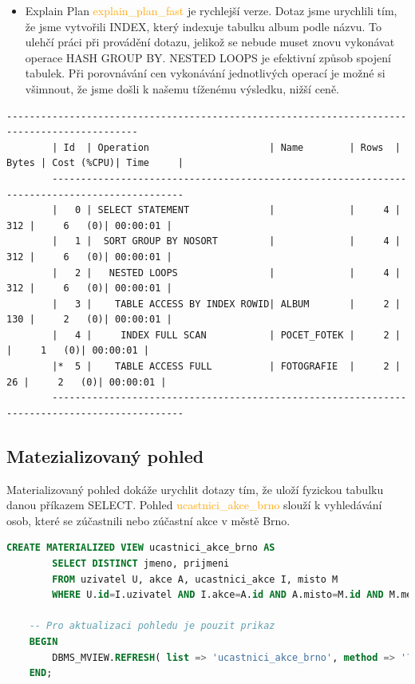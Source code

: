 \documentclass[11pt,a4paper]{article}
\begin{document}
        
        \begin{itemize}
            \item Explain Plan \textcolor{orange}{explain\_plan\_fast} je rychlejší verze. Dotaz jsme urychlili tím, že jsme vytvořili INDEX, který indexuje tabulku album podle názvu. To ulehčí práci při provádění dotazu, jelikož se nebude muset znovu vykonávat operace HASH GROUP BY. NESTED LOOPS je efektivní způsob spojení tabulek. Při porovnávání cen vykonávání jednotlivých operací je možné si všimnout, že jsme došli k našemu tíženému výsledku, nižší ceně.
        \end{itemize}
       \begin{Verbatim}[fontsize=\small]
        ---------------------------------------------------------------------------------------------
        | Id  | Operation                     | Name        | Rows  | Bytes | Cost (%CPU)| Time     |
        ---------------------------------------------------------------------------------------------
        |   0 | SELECT STATEMENT              |             |     4 |   312 |     6   (0)| 00:00:01 |
        |   1 |  SORT GROUP BY NOSORT         |             |     4 |   312 |     6   (0)| 00:00:01 |
        |   2 |   NESTED LOOPS                |             |     4 |   312 |     6   (0)| 00:00:01 |
        |   3 |    TABLE ACCESS BY INDEX ROWID| ALBUM       |     2 |   130 |     2   (0)| 00:00:01 |
        |   4 |     INDEX FULL SCAN           | POCET_FOTEK |     2 |       |     1   (0)| 00:00:01 |
        |*  5 |    TABLE ACCESS FULL          | FOTOGRAFIE  |     2 |    26 |     2   (0)| 00:00:01 |
        ---------------------------------------------------------------------------------------------
        \end{Verbatim}
    
    
    
    \subsection{Matezializovaný pohled}
    Materializovaný pohled dokáže urychlit dotazy tím, že uloží fyzickou tabulku danou příkazem SELECT.
    Pohled \textcolor{orange}{ucastnici\_akce\_brno} slouží k vyhledávání osob, které se zúčastnili nebo zúčastní akce v městě Brno.

    \begin{minipage}{\linewidth}
        \begin{center}
            \begin{lstlisting}[language=sql]
    CREATE MATERIALIZED VIEW ucastnici_akce_brno AS
        SELECT DISTINCT jmeno, prijmeni
        FROM uzivatel U, akce A, ucastnici_akce I, misto M
        WHERE U.id=I.uzivatel AND I.akce=A.id AND A.misto=M.id AND M.mesto='Brno';

    -- Pro aktualizaci pohledu je pouzit prikaz
    BEGIN
        DBMS_MVIEW.REFRESH( list => 'ucastnici_akce_brno', method => '?');
    END;\end{lstlisting}
        \end{center}
    \end{minipage}
    
\end{document}
